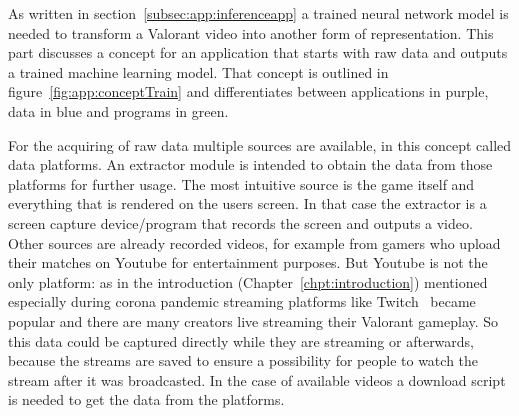 As written in section~\ref{subsec:app:inferenceapp} a trained neural network model is needed to 
transform a Valorant video into another form of representation. This part discusses a concept for an 
application that starts with raw data and outputs a trained machine learning model. That concept is 
outlined in figure~\ref{fig:app:conceptTrain} and differentiates between applications in purple, data 
in blue and programs in green.

For the acquiring of raw data multiple sources are available, in this concept called data platforms. 
An extractor module is intended to obtain the data from those platforms for further usage.
The most intuitive source is the game itself and everything that is rendered on the users screen. In 
that case the extractor is a screen capture device/program that records the screen and outputs a 
video. Other sources are already recorded videos, for example from gamers who upload their 
matches on Youtube for entertainment purposes. But Youtube is not the only platform: as in the 
introduction (Chapter~\ref{chpt:introduction}) mentioned especially during corona pandemic 
streaming platforms like Twitch~\cite{twitch} became popular and there are many creators live 
streaming their Valorant gameplay. So this data could be captured directly while they are streaming 
or afterwards, because the streams are saved to ensure a possibility for people to watch the stream 
after it was broadcasted. In the case of available videos a download script is needed to get the data 
from the platforms.

